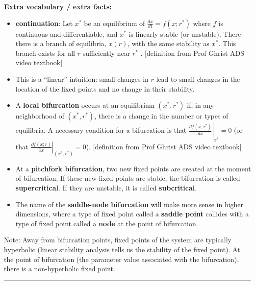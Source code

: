 \documentclass[12pt,letterpaper,noanswers]{exam}
\begin{document}
\noindent \textbf{Extra vocabulary / extra facts:}
\begin{tcolorbox}
\begin{itemize}
\item \textbf{continuation}: Let $x^*$ be an equilibrium of $\frac{dx}{dt} = f(x; r^*)$ where $f$ is continuous and differentiable, and $x^*$ is linearly stable (or unstable).  There there is a branch of equilibria, $x(r)$, with the same stability as $x^*$.  This branch exists for all $r$ sufficiently near $r^*$ .  [definition from Prof Ghrist ADS video textbook]

\item This is a ``linear'' intuition: small changes in $r$ lead to small changes in the location of the fixed points and no change in their stability.

\item A \textbf{local bifurcation} occurs at an equilibrium $(x^*, r^*)$ if, in any neighborhood of $(x^*, r^*)$, there is a change in the number or types of equilibria.  A necessary condition for a bifurcation is that $\left.\frac{df(x; r^*)}{dx}\right\vert_{x^*} = 0$ (or that $\left.\frac{\partial f(x; r)}{\partial x}\right\vert_{(x^*,r^*)} = 0$).
[definition from Prof Ghrist ADS video textbook]

\item At a \textbf{pitchfork bifurcation}, two new fixed points are created at the moment of bifurcation.  If these new fixed points are stable, the bifurcation is called \textbf{supercritical}.  If they are unstable, it is called \textbf{subcritical}.

\item The name of the \textbf{saddle-node bifurcation} will make more sense in higher dimensions, where a type of fixed point called a \textbf{saddle point} collides with a type of fixed point called a \textbf{node} at the point of bifurcation.
\end{itemize}

\end{tcolorbox}

\noindent Note: Away from bifurcation points, fixed points of the system are typically hyperbolic (linear stability analysis tells us the stability of the fixed point).  At the point of bifurcation (the parameter value associated with the bifurcation), there is a non-hyperbolic fixed point.

\vspace{0.2cm}

\hrule
\vspace{0.2cm}
\eject
\end{document}
